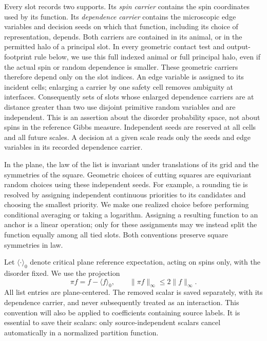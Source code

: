 Every slot records two supports.  Its \emph{spin carrier} contains the
spin coordinates used by its function.  Its \emph{dependence carrier}
contains the microscopic edge variables and decision seeds on which that
function, including its choice of representation, depends.  Both carriers
are contained in its animal, or in the permitted halo of a principal
slot.  In every geometric contact test and output-footprint rule below,
we use this full indexed animal or full principal halo, even if the
actual spin or random dependence is smaller.  These geometric carriers
therefore depend only on the slot indices.  An edge variable is assigned to its incident cells; enlarging a
carrier by one safety cell removes ambiguity at interfaces.  Consequently
sets of slots whose enlarged dependence carriers are at distance greater
than two use disjoint primitive random variables and are independent.
This is an assertion about the disorder probability space, not about
spins in the reference Gibbs measure.  Independent seeds are reserved at
all cells and all future scales.  A decision at a given scale reads only
the seeds and edge variables in its recorded dependence carrier.

In the plane, the law of the list is invariant under translations of its
grid and the symmetries of the square.  Geometric choices of cutting squares are equivariant random choices
using these independent seeds.  For example, a rounding tie is resolved
by assigning independent continuous priorities to its candidates and
choosing the smallest priority.  We make one realized choice before
performing conditional averaging or taking a logarithm.  Assigning a
resulting function to an anchor is a linear operation; only for these
assignments may we instead split the function equally among all tied
slots.  Both conventions preserve square symmetries in law.

Let $\langle\cdot\rangle_0$ denote critical plane reference expectation,
acting on spins only, with the disorder fixed.  We use the projection
\begin{equation}
 \pi f=f-\langle f\rangle_0,
 \qquad \|\pi f\|_\infty\le 2\|f\|_\infty.
 \label{block:centering}
\end{equation}
All list entries are plane-centered.  The removed scalar is saved
separately, with its dependence carrier, and never subsequently treated
as an interaction.  This convention will also be applied to coefficients
containing source labels.  It is essential to save their scalars: only
source-independent scalars cancel automatically in a normalized partition
function.


